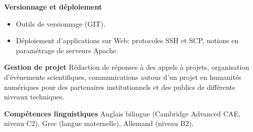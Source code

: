 \datedsubsection{ }
{}
{%
	\textbf{Versionnage et déploiement}}
{%
	\begin{itemize}
		\item Outils de versionnage (GIT).
		\item Déploiement d'applications sur Web: protocoles SSH et SCP, notions en paramétrage de serveurs Apache.
	\end{itemize}
}

\datedsubsection{ }
{}
{%
	\textbf{Gestion de projet}}
{%
	Rédaction de réponses à des appels à projets, organisation d'évènements scientifiques, communications autour d'un projet en humanités numériques pour des partenaires institutionnels et des publics de différents niveaux techniques. 
}

\datedsubsection{ }
{}
{%
	\textbf{Compétences linguistiques}}
{%
	Anglais bilingue (Cambridge Advanced CAE, niveau C2), Grec (langue maternelle), Allemand (niveau B2). }